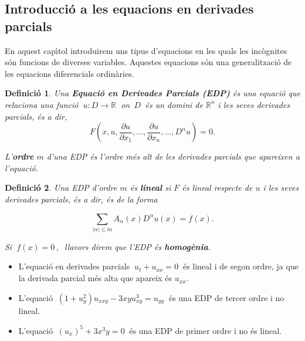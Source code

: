 \documentclass[12pt]{article}
\newtheorem{definicio}{Definici{\'o}}[subsection]
\newcommand{\R}{\mathbb{R}}
\begin{document}
\begin{center}
\section{Introducci{\'o} a les equacions en derivades parcials}
\end{center}

\parskip =0.3cm
\parindent =0cm
\itemindent=2cm
En aquest cap{\'\i}tol introduirem uns tipus d'equacions en les quals les inc{\`o}gnites s{\'o}n funcions de diverses variables. Aquestes equacions s{\'o}n una generalitzaci{\'o} de les equacions diferencials ordin{\`a}ries.


\vspace{0.4cm}
\begin{definicio}
Una \textbf{Equaci{\'o} en Derivades Parcials (EDP)} {\'e}s una equaci{\'o}  que relaciona una funci{\'o}
$\ u :D \rightarrow \R\ $ on $\,D\, $ {\'e}s un domini de $\R^n$ i les seves derivades parcials, {\'e}s a dir,
\vspace{0.3cm}
\begin{equation}\label{edp}
 F(x,u,\frac{\partial u}{\partial x_1},\ldots,\frac{\partial u}{\partial x_n},\ldots,D^\alpha u)=0.
\end{equation}

L'\textbf{ordre} $m$ d'una EDP {\'e}s l'ordre m{\'e}s alt de les derivades parcials que apareixen a l'equaci{\'o}.
\end{definicio}

\vspace{0.4cm}
\begin{definicio}
 Una EDP d'ordre $m$ {\'e}s \textbf{lineal} si $F$ {\'e}s lineal respecte de $u$ i les seves derivades parcials, {\'e}s a dir, {\'e}s de la forma

\[
 \sum_{|\alpha |\leq m} A_\alpha (x)D^{\alpha} u(x)=f(x).
\]

Si $\ f(x)=0\,,\ $ llavors direm que l'EDP {\'e}s \textbf{homog{\`e}nia}.
\end{definicio}

\vspace{0.4cm}
\begin{exemples}
\begin{itemize}
 \item L'equaci{\'o} en derivades parcials $\ u_t+u_{xx}=0\ $ {\'e}s lineal i de segon ordre, ja que la derivada parcial m{\'e}s alta que apareix {\'e}s $u_{xx}.$
\item L'equaci{\'o} $\ (1+u_y^2)u_{xxy}-3xyu_{xy}^3=u_{yy}\ $ {\'e}s una EDP de tercer ordre i no lineal.
\item L'equaci{\'o} $\ (u_x)^5+3x^3y=0\ $ {\'e}s una EDP de primer ordre i no {\'e}s lineal.
\end{itemize}
\end{exemples}
\end{document}
